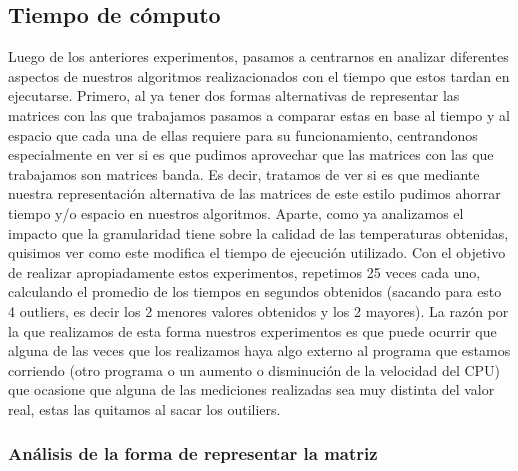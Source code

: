 \documentclass[10pt, a4paper]{article}
\begin{document}
\subsection{Tiempo de c\'omputo}

Luego de los anteriores experimentos, pasamos a centrarnos en analizar diferentes aspectos de nuestros algoritmos realizacionados con el tiempo que estos tardan en ejecutarse. Primero, al ya tener dos formas alternativas de representar las matrices con las que trabajamos pasamos a comparar estas en base al tiempo y al espacio que cada una de ellas requiere para su funcionamiento, centrandonos especialmente en ver si es que pudimos aprovechar que las matrices con las que trabajamos son matrices banda. Es decir, tratamos de ver si es que mediante nuestra representaci\'on alternativa de las matrices de este estilo pudimos ahorrar tiempo y/o espacio en nuestros algoritmos. Aparte, como ya analizamos el impacto que la granularidad tiene sobre la calidad de las temperaturas obtenidas, quisimos ver como este modifica el tiempo de ejecuci\'on utilizado. Con el objetivo de realizar apropiadamente estos experimentos, repetimos 25 veces cada uno, calculando el promedio de los tiempos en segundos obtenidos (sacando para esto 4 outliers, es decir los 2 menores valores obtenidos y los 2 mayores). La raz\'on por la que realizamos de esta forma nuestros experimentos es que puede ocurrir que alguna de las veces que los realizamos haya algo externo al programa que estamos corriendo (otro programa o un aumento o disminuci\'on de la velocidad del CPU) que ocasione que alguna de las mediciones realizadas sea muy distinta del valor real, estas las quitamos al sacar los outiliers.

\subsubsection{An\'alisis de la forma de representar la matriz}
\end{document}
